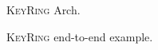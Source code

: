 \documentclass[sigconf]{acmart} %
\providecommand{\sys}{\textsc{KeyRing}} %
\begin{document}
%         

    \begin{figure}[h]
        \centering
        
        \caption{\sys{} Arch.}
\end{figure}

    \begin{figure}[h]
        \centering
        \resizebox{\textwidth}{!}{}
        \caption{\sys{} end-to-end example.}
\end{figure}

%         

%         

   
\end{document}
